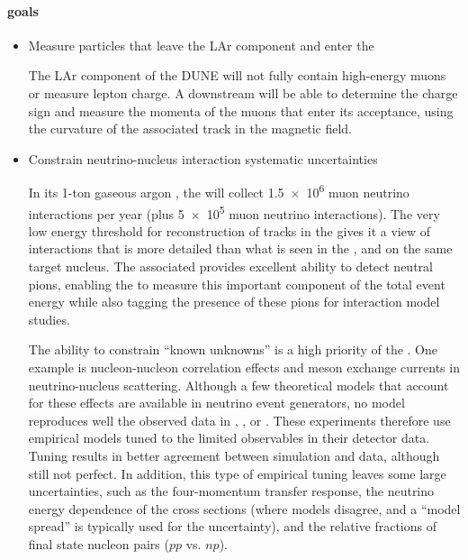 \paragraph{ goals}
\begin{itemize}

\item {Measure particles that leave the LAr  component and enter the  
    
The LAr component of the DUNE  will not fully contain high-energy muons or measure lepton charge.  A downstream  will be able to determine the charge sign and measure the momenta of the muons that enter its acceptance, using the curvature of the associated track in the magnetic field. } 


    \item {Constrain neutrino-nucleus interaction systematic uncertainties

  
In its 1-ton gaseous argon , the  will collect \num{1.5e6}  muon neutrino interactions per year (plus \num{5e5}  muon neutrino interactions). The very low energy threshold for reconstruction of tracks in the  gives it a view of interactions that is more detailed than what is seen in the , and on the same target nucleus. The associated  provides excellent ability to detect neutral pions, enabling the  to measure this important component of the total event energy while also tagging the presence of these pions for interaction model studies.


The ability to constrain ``known unknowns'' is a high priority of the . One example is nucleon-nucleon correlation effects and meson exchange currents in neutrino-nucleus scattering.  Although a few theoretical models that account for these effects are available in neutrino event generators, no model reproduces well the observed data in , , or .  These experiments therefore use empirical models tuned to the limited observables in their detector data.  Tuning results in better agreement between simulation and data, although still not perfect. In addition, this type of empirical tuning leaves some large uncertainties, such as the four-momentum transfer response, the neutrino energy dependence of the cross sections (where models disagree, and a ``model spread'' is typically used for the uncertainty), and the relative fractions of final state nucleon pairs ($pp$ vs. $np$). 



}
\end{itemize}
